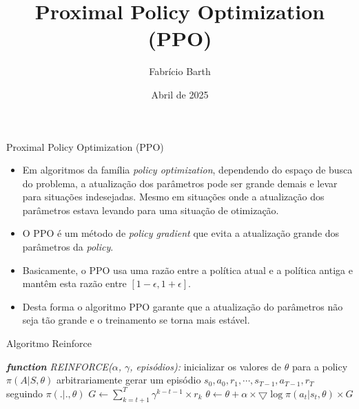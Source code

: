 \documentclass{beamer}
\begin{document}
	
\title{Proximal Policy Optimization (PPO)} 
\author{Fabrício Barth}
\date{Abril de 2025}
	
\maketitle

\def\HiLi{\leavevmode\rlap{\hbox to \hsize{\color{yellow!50}\leaders\hrule height .8\baselineskip depth .5ex\hfill}}}
	
\def\TA{\leavevmode\rlap{\hbox to \hsize{\color{cyan!50}\leaders\hrule height .8\baselineskip depth .5ex\hfill}}}

\def\TB{\leavevmode\rlap{\hbox to \hsize{\color{red!50}\leaders\hrule height .8\baselineskip depth .5ex\hfill}}}
	
\begin{frame}{Proximal Policy Optimization (PPO)}
	\begin{itemize}
		\item Em algoritmos da família \textit{policy optimization}, dependendo do espaço de busca do problema, a atualização dos parâmetros pode ser grande demais e levar para situações indesejadas. Mesmo em situações onde a atualização dos parâmetros estava levando para uma situação de otimização. 
		\item O PPO é um método de \textit{policy gradient} que evita a atualização grande dos parâmetros da \textit{policy}.
		\item Basicamente, o PPO usa uma razão entre a política atual e a política antiga e mantêm esta razão entre $\left[ 1 - \epsilon, 1 + \epsilon \right]$.
		\item Desta forma o algoritmo PPO garante que a atualização do parâmetros não seja tão grande e o treinamento se torna mais estável. 
	\end{itemize}
	
	
\end{frame}
	

\begin{frame}{Algoritmo Reinforce}
	\begin{algorithmic} 
		\STATE \emph{\textbf{function} REINFORCE($\alpha$, $\gamma$, episódios):}
		\STATE inicializar os valores de $\theta$ para a policy $\pi(A|S,\theta)$ arbitrariamente
		\STATE gerar um episódio ${s_{0},a_{0},r_{1},\cdots,s_{T-1},a_{T-1},r_{T}}$ seguindo $\pi(.|.,\theta)$
			\STATE $G \leftarrow \sum_{k=t+1}^{T} \gamma^{k-t-1} \times r_{k}$
			\STATE $\theta \leftarrow \theta + \alpha \times \bigtriangledown \log \pi(a_{t}|s_{t}, \theta) \times G$
		\ENDFOR
		\ENDFOR
	\end{algorithmic}
\end{frame}
\end{document}
